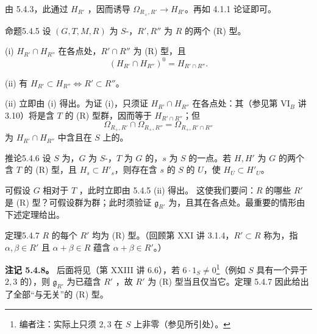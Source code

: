 由 5.4.3，此通过 $H_{R'}$ ，因而诱导 $\Omega_{R_+,R'}\to H_{R'}$。再如 4.1.1 论证即可。
\begin{SGAresult}{命题}{5.4.5} 设 $(G,T,M,R)$ 为 $S$-，$R',R''$ 为 $R$ 的两个 (R) 型。

(i) $H_{R'}\cap H_{R''}$ 在各点处，$R'\cap R''$ 为 (R) 型，且
\[(H_{R'}\cap H_{R''})^0=H_{R'\cap R''}.\]

(ii) 有 $H_{R'}\subset H_{R''}\Longleftrightarrow R'\subset R''$。
\end{SGAresult}
(ii) 立即由 (i) 得出。为证 (i)，只须证 $H_{R'}\cap H_{R''}$ 在各点处：其（参见第 VI$_B$ 讲 3.10）将是含 $T$ 的 (R) 型群，因而等于 $H_{R'\cap R''}$；但
\[\Omega_{R_+,R'}\cap\Omega_{R_+,R''}=\Omega_{R_+,R'\cap R''}\]
为 $H_{R'}\cap H_{R''}$ 中含且在 $S$ 上的。
\begin{SGAresult}{推论}{5.4.6} 设 $S$ 为，$G$ 为 $S$-，$T$ 为 $G$ 的，$s$ 为 $S$ 的一点。若 $H,H'$ 为 $G$ 的两个含 $T$ 的 (R) 型，且 $H_s\subset H'_s$，则存在含 $s$ 的 $S$ 的 $U$，使 $H_U\subset H'_U$。\end{SGAresult}
可假设 $G$ 相对于 $T$ ，此时立即由 5.4.5 (ii) 得出。
这使我们要问：$R$ 的哪些 $R'$ 是 (R) 型？可假设群为群；此时须验证 $\mathfrak g_{R'}$ 为，且其在各点处。最重要的情形由下述定理给出。
\begin{SGAresult}{定理}{5.4.7} $R$ 的每个 $R'$ 均为 (R) 型。（回顾第 XXI 讲 3.1.4，$R'\subset R$ 称为，指 $\alpha,\beta\in R'$ 且 $\alpha+\beta\in R$ 蕴含 $\alpha+\beta\in R'$。）\end{SGAresult}
\textbf{注记 5.4.8。} 后面将见（第 XXIII 讲 6.6），若 $6\cdot1_S\ne0$\footnote{编者注：实际上只须 $2,3$ 在 $S$ 上非零（参见所引处）。}（例如 $S$ 具有一个异于 $2,3$ 的），则 $\mathfrak g_{R'}$ 为已蕴含 $R'$ ，故 $R'$ 为 (R) 型当且仅当它。定理 5.4.7 因此给出了全部“与无关”的 (R) 型。
